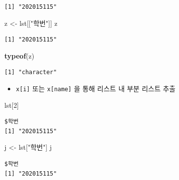 \documentclass[
  11pt,
]{krantz}
\newenvironment{Shaded}{\begin{snugshade}}{\end{snugshade}}
\newcommand{\DecValTok}[1]{\textcolor[rgb]{0.06,0.06,0.06}{#1}}
\newcommand{\KeywordTok}[1]{\textcolor[rgb]{0.27,0.27,0.27}{\textbf{#1}}}
\newcommand{\NormalTok}[1]{#1}
\newcommand{\StringTok}[1]{\textcolor[rgb]{0.5,0.5,0.5}{#1}}
\providecommand{\tightlist}{%
  \setlength{\itemsep}{0pt}\setlength{\parskip}{0pt}}
\begin{document}
\begin{verbatim}
[1] "202015115"
\end{verbatim}

\begin{Shaded}
\begin{Highlighting}[]
\NormalTok{z <-}\StringTok{ }\NormalTok{lst[[}\StringTok{"학번"}\NormalTok{]]}
\NormalTok{z}
\end{Highlighting}
\end{Shaded}

\begin{verbatim}
[1] "202015115"
\end{verbatim}

\begin{Shaded}
\begin{Highlighting}[]
\KeywordTok{typeof}\NormalTok{(z)}
\end{Highlighting}
\end{Shaded}

\begin{verbatim}
[1] "character"
\end{verbatim}

\normalsize

\begin{itemize}
\tightlist
\item
  \texttt{x{[}i{]}} 또는 \texttt{x{[}name{]}} 을 통해 리스트 내 부분 리스트 추출
\end{itemize}

\footnotesize

\begin{Shaded}
\begin{Highlighting}[]
\NormalTok{lst[}\DecValTok{2}\NormalTok{]}
\end{Highlighting}
\end{Shaded}

\begin{verbatim}
$학번
[1] "202015115"
\end{verbatim}

\begin{Shaded}
\begin{Highlighting}[]
\NormalTok{j <-}\StringTok{ }\NormalTok{lst[}\StringTok{"학번"}\NormalTok{]}
\NormalTok{j}
\end{Highlighting}
\end{Shaded}

\begin{verbatim}
$학번
[1] "202015115"
\end{verbatim}
\end{document}
